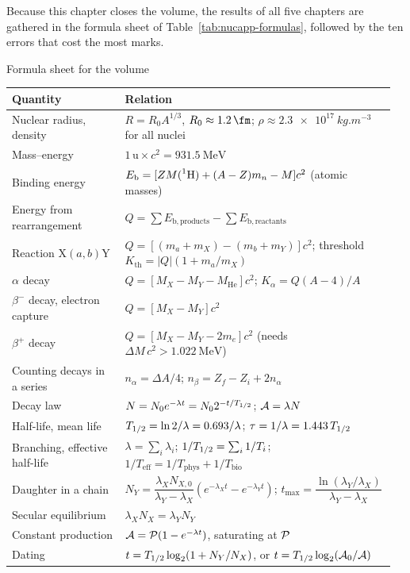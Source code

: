 Because this chapter closes the volume, the results of all five chapters are gathered in the
formula sheet of Table~\ref{tab:nucapp-formulas}, followed by the ten errors that cost the most marks.

\begin{tablebox}{Formula sheet for the volume}
\renewcommand{\arraystretch}{1.22}
\begin{tabular}{@{}p{0.29\linewidth}p{0.67\linewidth}@{}}\toprule
Quantity & Relation\\\midrule
Nuclear radius, density & $R=R_0A^{1/3}$, $R_0\approx\SI{1.2}{\fm}$; $\rho\approx\SI{2.3e17}{kg.m^{-3}}$ for all nuclei\\
Mass--energy & $1\,\si{\amu}\times c^2=\SI{931.5}{\MeV}$\\
Binding energy & $E_{\mathrm{b}}=[ZM(\prescript{1}{}{\mathrm{H}})+(A-Z)m_n-M]c^2$ (atomic masses)\\
Energy from rearrangement & $Q=\sum E_{\mathrm{b},\text{products}}-\sum E_{\mathrm{b},\text{reactants}}$\\
Reaction X$(a,b)$Y & $Q=[(m_a+m_X)-(m_b+m_Y)]c^2$; threshold $K_\text{th}=|Q|(1+m_a/m_X)$\\
$\alpha$ decay & $Q=[M_X-M_Y-M_\text{He}]c^2$; $K_\alpha=Q(A-4)/A$\\
$\beta^-$ decay, electron capture & $Q=[M_X-M_Y]c^2$\\
$\beta^+$ decay & $Q=[M_X-M_Y-2m_e]c^2$ (needs $\Delta M\,c^2>\SI{1.022}{\MeV}$)\\
Counting decays in a series & $n_\alpha=\Delta A/4$; $n_\beta=Z_f-Z_i+2n_\alpha$\\
Decay law & $N=N_0e^{-\lambda t}=N_02^{-t/T_{1/2}}$; $\mathcal{A}=\lambda N$\\
Half-life, mean life & $T_{1/2}=\ln2/\lambda=0.693/\lambda$; $\tau=1/\lambda=1.443\,T_{1/2}$\\
Branching, effective half-life & $\lambda=\sum_i\lambda_i$; $1/T_{1/2}=\sum_i1/T_i$; $1/T_\text{eff}=1/T_\text{phys}+1/T_\text{bio}$\\
Daughter in a chain & $N_Y=\dfrac{\lambda_XN_{X,0}}{\lambda_Y-\lambda_X}\left(e^{-\lambda_Xt}-e^{-\lambda_Yt}\right)$;
  $t_{\max}=\dfrac{\ln(\lambda_Y/\lambda_X)}{\lambda_Y-\lambda_X}$\\
Secular equilibrium & $\lambda_XN_X=\lambda_YN_Y$\\
Constant production & $\mathcal{A}=\mathcal{P}(1-e^{-\lambda t})$, saturating at $\mathcal{P}$\\
Dating & $t=T_{1/2}\log_2(1+N_Y/N_X)$, or $t=T_{1/2}\log_2(\mathcal{A}_0/\mathcal{A})$\\

\end{tabular}
\end{tablebox}
